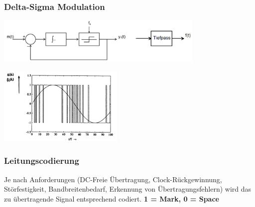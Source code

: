 \subsubsection{Delta-Sigma Modulation}
\begin{minipage}{10cm}
	\includegraphics[width=10cm]{bilder/dig_delta_sigma_modulator_schema}
\end{minipage}
\begin{minipage}{6cm}
	\includegraphics[width=6cm]{bilder/dig_delta_sigma_modulation}
\end{minipage}
	

\newpage
\subsubsection{Leitungscodierung }
Je nach Anforderungen (DC-Freie Übertragung, Clock-Rückgewinnung, Störfestigkeit,
Bandbreitenbedarf, Erkennung von Übertragungsfehlern) wird das zu übertragende Signal entsprechend
codiert. \textbf{1 = Mark, 0 = Space}

